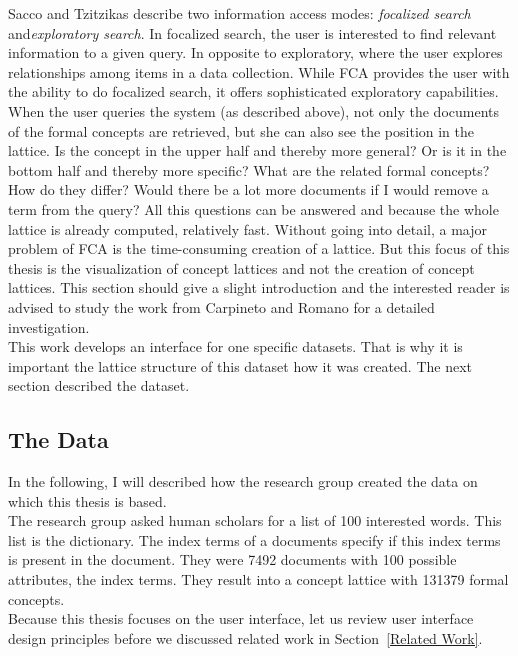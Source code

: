 \documentclass[11pt]{report}
\begin{document}
Sacco and Tzitzikas \cite{Sacco2009} describe two information access modes: \textit{focalized search} and\textit{exploratory search}. In focalized search, the user is interested to find relevant information to a given query. In opposite to exploratory, where the user explores relationships among items in a data collection. While FCA provides the user with the ability to do focalized search, it offers sophisticated exploratory capabilities. When the user queries the system (as described above), not only the documents of the formal concepts are retrieved, but she can also see the position in the lattice. Is the concept in the upper half and thereby more general? Or is it in the bottom half and thereby more specific? What are the related formal concepts? How do they differ? Would there be a lot more documents if I would remove a term from the query? All this questions can be answered and because the whole lattice is already computed, relatively fast. Without going into detail, a major problem of FCA is the time-consuming creation of a lattice. But this focus of this thesis is the visualization of concept lattices and not the creation of concept lattices. This section should give a slight introduction and the interested reader is advised to study the work from Carpineto and Romano \cite{carpineto2004concept} for a detailed investigation. \\

This work develops an interface for one specific datasets. That is why it is important the lattice structure of this dataset how it was created. The next section described the dataset.

\subsection{The Data}
In the following, I will described how the research group created the data on which this thesis is based. \\

The research group asked human scholars for a list of 100 interested words. This list is the dictionary. The index terms of a documents specify if this index terms is present in the document. They were 7492 documents with 100 possible attributes, the index terms. They result into a concept lattice with 131379 formal concepts.\\

Because this thesis focuses on the user interface, let us review user interface design principles before we discussed related work in Section~\ref{Related Work}.
\end{document}
